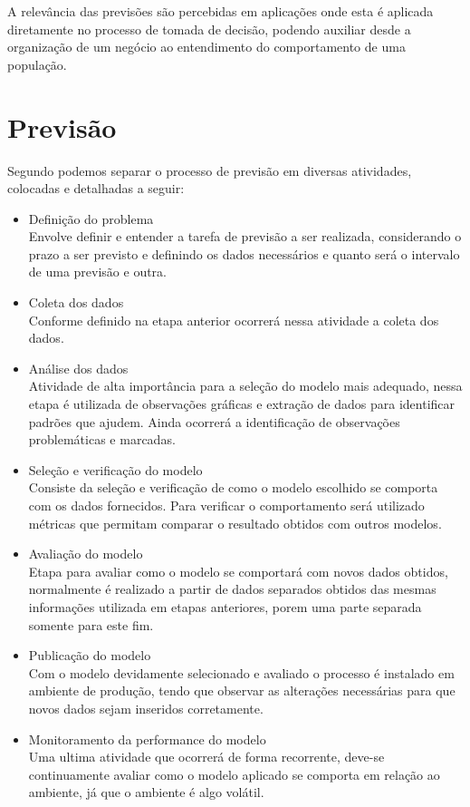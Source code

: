 \documentclass[
	12pt,
	oneside,
	a4paper,
	english,
	brazil
]{abntex2}
\begin{document}
A relevância das previsões são percebidas em aplicações onde esta é aplicada 
diretamente no processo de tomada de decisão, podendo auxiliar desde a 
organização de um negócio ao entendimento do comportamento de uma população.

\section{Previsão}
Segundo  podemos separar o processo de previsão em diversas 
atividades, colocadas e detalhadas a seguir:

\begin{itemize}
	\item Definição do problema\\
		Envolve definir e entender a tarefa de previsão a ser realizada,
		considerando o prazo a ser previsto e definindo os dados necessários e
		quanto será o intervalo de uma previsão e outra.
	\item Coleta dos dados\\
		Conforme definido na etapa anterior ocorrerá nessa atividade a coleta
		dos dados.
	\item Análise dos dados\\
		Atividade de alta importância para a seleção do modelo mais adequado,
		nessa etapa é utilizada de observações gráficas e extração de dados para
		identificar padrões que ajudem. Ainda ocorrerá a identificação de 
		observações problemáticas e marcadas.
	\item Seleção e verificação do modelo\\
		Consiste da seleção e verificação de como o modelo escolhido se comporta 
		com os dados fornecidos. Para verificar o comportamento será utilizado 
		métricas que permitam comparar o resultado obtidos com outros modelos.
	\item Avaliação do modelo\\
		Etapa para avaliar como o modelo se comportará com novos dados obtidos, 
		normalmente é realizado a partir de dados separados obtidos das mesmas 
		informações utilizada em etapas anteriores, porem uma parte separada 
		somente para este fim.
	\item Publicação do modelo\\
		Com o modelo devidamente selecionado e avaliado o processo é instalado 
		em ambiente de produção, tendo que observar as alterações necessárias 
		para que novos dados sejam inseridos corretamente.
	\item Monitoramento da performance do modelo\\
		Uma ultima atividade que ocorrerá de forma recorrente, deve-se 
		continuamente avaliar como o modelo aplicado se comporta em relação ao 
		ambiente, já que o ambiente é algo volátil.
\end{itemize}
\end{document}

